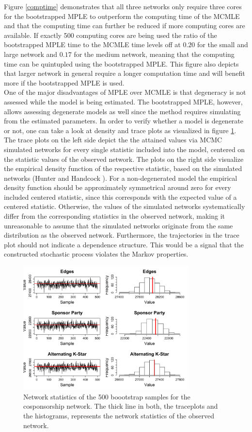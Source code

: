 \documentclass[10pt, conference, compsocconf]{IEEEtran}
\begin{document}
\indent Figure \ref{comptime} demonstrates that all three networks only require three cores for the bootstrapped MPLE to outperform the computing time of the MCMLE and that the computing time can further be reduced if more computing cores are available. If exactly 500 computing cores are being used the ratio of the bootstrapped MPLE time to the MCMLE time levels off at $0.20$ for the small and large network and $0.17$ for the medium network, meaning that the computing time can be quintupled using the bootstrapped MPLE. This figure also depicts that larger network in general require a longer computation time and will benefit more if the bootstrapped MPLE is used.\\ 
\indent One of the major disadvantages of MPLE over MCMLE is that degeneracy is not assessed while the model is being estimated.  The bootstrapped MPLE, however, allows assessing degenerate models as well since the method requires simulating from the estimated parameters. In order to verify whether a model is degenerate or not, one can take a look at density and trace plots as visualized in figure \ref{diagnostics}. The trace plots on the left side depict the the attained values via MCMC simulated networks for every single statistic included into the model, centered on the statistic values of the observed network. The plots on the right side visualize the empirical density function of the respective statistic, based on the simulated networks (Hunter and Handcock \cite{Hunter.2006}). For a non-degenerated model the empirical density function should be approximately symmetrical around zero for every included centered statistic, since this corresponds with the expected value of a centered statistic. 
Otherwise, the values of the simulated networks systematically differ from the corresponding statistics in the observed network, making it unreasonable to assume that the simulated networks originate from the same distribution as the observed network. Furthermore, the trajectories in the trace plot should not indicate a dependence structure. This would be a signal that the constructed stochastic process violates the Markov properties.

\begin{figure}
\includegraphics[width=9cm]{MPLE_histogram_traceplot_cosponsorship} 
\caption{Network statistics of the 500 boootstrap samples for the cosponsorship network. The thick line in both, the traceplots and the histograms, represents the network statistics of the observed network. } 
\label{diagnostics}
\vspace{-.5cm}
\end{figure}
\end{document}
